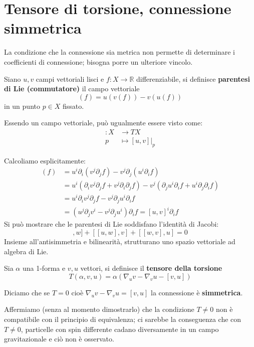 \section{Tensore di torsione, connessione simmetrica}
La condizione che la connessione sia metrica non permette di determinare i coefficienti di connessione; bisogna porre un ulteriore vincolo.
\begin{definizione}
Siano $u,v$ campi vettoriali lisci e $f: X \rightarrow \mathbb{R}$ differenziabile, si definisce \textbf{parentesi di Lie (commutatore)} il campo vettoriale
\begin{equation*}
    [u,v](f) = u(v(f)) - v(u(f))
\end{equation*}
in un punto $p\in X$ fissato.
\end{definizione}
Essendo un campo vettoriale, può ugualmente essere visto come:
\begin{align*}
    [u, v] : X &\rightarrow TX \\
             p &\mapsto [u, v]|_p   
\end{align*}

Calcoliamo esplicitamente:
\begin{align*}
    [u,v] (f) &= u^i\partial_i(v^j\partial_j f) - v^j\partial_j(u^i\partial_i f) \\
    &= u^i(\partial_iv^j\partial_j f + v^j \partial_i\partial_j f ) - v^j(\partial_j u^i \partial_i f + u^i \partial_j \partial_i f) \\
    &= u^i\partial_iv^j\partial_j f - v^j\partial_j u^i \partial_i f \\
    &= (u^j \partial_j v^i -v^j \partial_j u^i) \partial_i f = [u,v]^i \partial_i f
\end{align*}
Si può mostrare che le parentesi di Lie soddisfano l'identità di Jacobi:
\begin{equation*}
    [[v,u],w] + [[u,w],v] + [[w,v],u] = 0
\end{equation*}
Insieme all'antisimmetria e bilinearità, strutturano uno spazio vettoriale ad algebra di Lie.

\begin{definizione}
Sia $\alpha$ una 1-forma e $v, u$ vettori, si definisce il \textbf{tensore della torsione}
\begin{equation*}
    T(\alpha, v, u) = \alpha( \nabla_u v - \nabla_v u - [v,u]) 
\end{equation*}
\end{definizione}
\begin{definizione}
Diciamo che se $T = 0$ cioè $\nabla_u v - \nabla_v u = [v,u]$ la connessione è \textbf{simmetrica}.
\end{definizione}
Affermiamo (senza al momento dimostrarlo) che la condizione $T \neq 0$ non è compatibile con il principio di equivalenza; ci sarebbe la conseguenza che con $T \neq 0$, particelle con spin differente cadano diversamente in un campo gravitazionale e ciò non è osservato.


